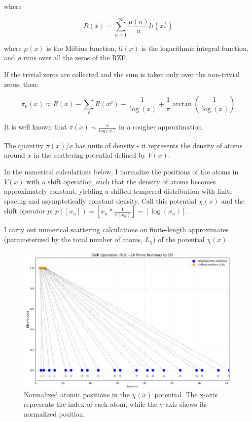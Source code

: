 \documentclass[11pt, oneside]{article}
\begin{document}
where

\begin{equation}
R(x) = \sum_{n=1}^{\infty}\frac{\mu(n)}{n}li(x^{\frac{1}{n}})
\end{equation}

where $\mu(x)$ is the M\"obius function, $li(x)$ is the logarithmic integral function, and $\rho$ runs over all the zeros of the RZF.

If the trivial zeros are collected and the sum is taken only over the non-trivial zeros, then:

\begin{equation}
\pi_0(x) \approx R(x) - \sum_{\rho}R(x^{\rho}) - \frac{1}{\log(x)} + \frac{1}{\pi}\arctan(\frac{1}{\log(x)})
\end{equation}
 
It is well known that $\pi(x) \sim \frac{x}{log(x)}$ in a rougher approximation.

The quantity $\pi(x)/x$ has units of density - it represents the density of atoms around $x$ in the scattering potential defined by $V(x)$.

In the numerical calculations below, I normalize the positions of the atoms in $V(x)$ with a shift operation, such that the density of atoms becomes approximately constant, yielding a shifted tempered distribution with finite spacing and asymptotically constant density. Call this potential $\chi(x)$ and the shift operator $p$: $p([x_n]) = [x_n * \frac{1}{\pi(x_n)}] \sim [\log(x_n)]$.





I carry out numerical scattering calculations on finite-length approximates (parameterized by the total number of atoms, $L_{\chi}$) of the potential $\chi(x)$.

\begin{figure}[htbp]
\begin{center}
    \includegraphics[width=0.8\linewidth]{../images/normalizing.png}
\caption{Normalized atomic positions in the $\chi(x)$ potential. The x-axis represents the index of each atom, while the y-axis shows its normalized position.}
\label{fig:normalized_positions}
\end{center}
\end{figure}
\end{document}
